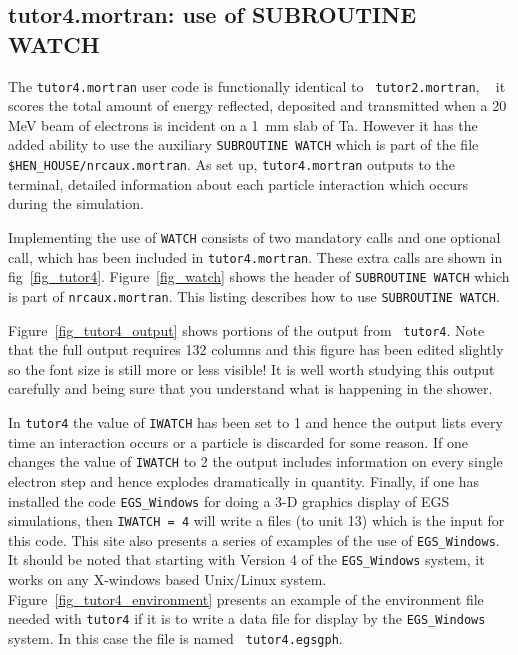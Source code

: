 \begin{latexonly}

\newpage

\clearpage
\end{latexonly}

\begin{htmlonly}
\clearpage

\clearpage

\clearpage
\end{htmlonly}

\subsection{tutor4.mortran: use of SUBROUTINE WATCH}
\label{tutor4}


The {\tt tutor4.mortran} user code is functionally identical to {\tt
tutor2.mortran}, \ie~ it scores the total amount of energy reflected,
deposited and transmitted when a 20 MeV beam of electrons is incident
on a 1~mm slab of Ta.  However it has the added ability to use the
auxiliary {\tt SUBROUTINE WATCH} which is part of the file {\tt
\$HEN\_HOUSE/nrcaux.mortran}.  As set up, {\tt tutor4.mortran} outputs
to the terminal, detailed information about each particle interaction
which occurs during the simulation.

Implementing the use of {\tt WATCH} consists of two mandatory calls and one
optional call, which has been included in {\tt tutor4.mortran}.   These
extra calls are shown in fig~\ref{fig_tutor4}. Figure~\ref{fig_watch} shows
the header of {\tt SUBROUTINE WATCH} which is part of {\tt nrcaux.mortran}.
This listing describes how to use {\tt SUBROUTINE WATCH}.

Figure~\ref{fig_tutor4_output} shows portions of the output from {\tt
tutor4}.  Note that the full output requires 132 columns and this figure
has been edited slightly so the font size is still more or less visible!
It is well worth studying this output carefully and being sure that you
understand what is happening in the shower.


In {\tt tutor4} the value of {\tt IWATCH} has been set to 1 and hence the output
lists every time an interaction occurs or a particle is discarded for some
reason.  If one changes the value of {\tt IWATCH} to 2 the output includes
information on every single electron step and hence explodes dramatically
in quantity.  Finally, if one has installed the code {\tt EGS\_Windows} for
doing a 3-D graphics display of EGS simulations, then {\tt IWATCH = 4} will
write a files (to unit 13) which is the input for this code.  This
site also presents a series of examples of the use of {\tt EGS\_Windows}.
It should be noted that starting with Version 4 of the {\tt EGS\_Windows}
system, it works on any X-windows based Unix/Linux system\cite{TR99a}.
Figure~\ref{fig_tutor4_environment} presents an example of the environment
file needed with {\tt tutor4} if it is to write a data file for display by
the {\tt EGS\_Windows} system.  In this case the file is named {\tt
tutor4.egsgph}.

